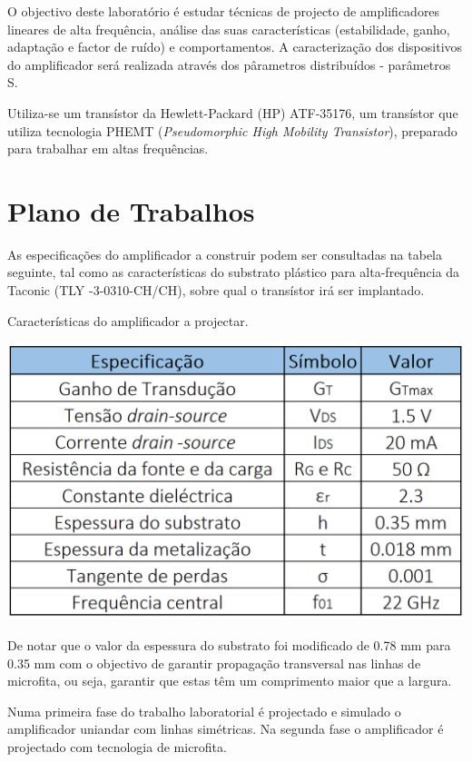 \documentclass[11pt]{article}
\numberwithin{equation}{section}
\begin{document}
O objectivo deste laboratório é estudar técnicas de projecto de amplificadores lineares de alta frequência, análise das suas características (estabilidade, ganho, adaptação e factor de ruído) e comportamentos. A caracterização dos dispositivos do amplificador será realizada através dos pârametros distribuídos - parâmetros S.

Utiliza-se um transístor da Hewlett-Packard (HP) ATF-35176, um transístor que utiliza tecnologia PHEMT (\textit{Pseudomorphic High Mobility Transistor}), preparado para trabalhar em altas frequências.

\section{Plano de Trabalhos}

As especificações do amplificador a construir podem ser consultadas na tabela seguinte, tal como as características do substrato plástico para alta-frequência da Taconic (TLY -3-0310-CH/CH), sobre qual o transístor irá ser implantado. 

\begin{table}[H]
	\centering
	\caption{Características do amplificador a projectar.}
	\vspace{-1.5mm}
	\includegraphics[keepaspectratio=true, scale=0.40]{teoricas/table1}
	\label{tab:car}
\end{table}

De notar que o valor da espessura do substrato foi modificado de 0.78 mm para 0.35 mm com o objectivo de garantir propagação transversal nas linhas de microfita, ou seja, garantir que estas têm um comprimento maior que a largura. 

Numa primeira fase do trabalho laboratorial é projectado e simulado o amplificador uniandar com linhas simétricas. Na segunda fase o amplificador é projectado com tecnologia de microfita.
\end{document}
